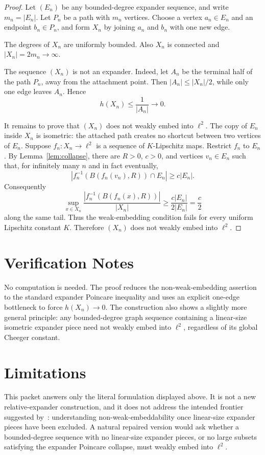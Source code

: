 \documentclass[11pt]{article}
\begin{document}
\begin{proof}
Let \((E_n)\) be any bounded-degree expander sequence, and write
\(m_n=|E_n|\).  Let \(P_n\) be a path with \(m_n\) vertices.  Choose a vertex
\(a_n\in E_n\) and an endpoint \(b_n\in P_n\), and form \(X_n\) by joining
\(a_n\) and \(b_n\) with one new edge.

The degrees of \(X_n\) are uniformly bounded.  Also \(X_n\) is connected and
\(|X_n|=2m_n\to\infty\).

The sequence \((X_n)\) is not an expander.  Indeed, let \(A_n\) be the terminal
half of the path \(P_n\), away from the attachment point.  Then
\(|A_n|\le |X_n|/2\), while only one edge leaves \(A_n\).  Hence
\[
  h(X_n)\le \frac{1}{|A_n|}\to 0.
\]

It remains to prove that \((X_n)\) does not weakly embed into \(\ell^2\).
The copy of \(E_n\) inside \(X_n\) is isometric: the attached path creates no
shortcut between two vertices of \(E_n\).  Suppose \(f_n:X_n\to\ell^2\) is a
sequence of \(K\)-Lipschitz maps.  Restrict \(f_n\) to \(E_n\).  By
Lemma~\ref{lem:collapse}, there are \(R>0\), \(c>0\), and vertices
\(v_n\in E_n\) such that, for infinitely many \(n\) and in fact eventually,
\[
  |f_n^{-1}(B(f_n(v_n),R))\cap E_n|\ge c|E_n|.
\]
Consequently
\[
  \sup_{x\in X_n}
  \frac{|f_n^{-1}(B(f_n(x),R))|}{|X_n|}
  \ge
  \frac{c|E_n|}{2|E_n|}
  =
  \frac{c}{2}
\]
along the same tail.  Thus the weak-embedding condition fails for every
uniform Lipschitz constant \(K\).  Therefore \((X_n)\) does not weakly embed
into \(\ell^2\).
\end{proof}

\section*{Verification Notes}

No computation is needed.  The proof reduces the non-weak-embedding assertion
to the standard expander Poincare inequality and uses an explicit one-edge
bottleneck to force \(h(X_n)\to 0\).  The construction also shows a slightly
more general principle: any bounded-degree graph sequence containing a
linear-size isometric expander piece need not weakly embed into \(\ell^2\),
regardless of its global Cheeger constant.

\section*{Limitations}

This packet answers only the literal formulation displayed above.  It is not a
new relative-expander construction, and it does not address the intended
frontier suggested by~\cite{AT}: understanding non-weak-embeddability once
linear-size expander pieces have been excluded.  A natural repaired version
would ask whether a bounded-degree sequence with no linear-size expander
pieces, or no large subsets satisfying the expander Poincare collapse, must
weakly embed into \(\ell^2\).
\end{document}
